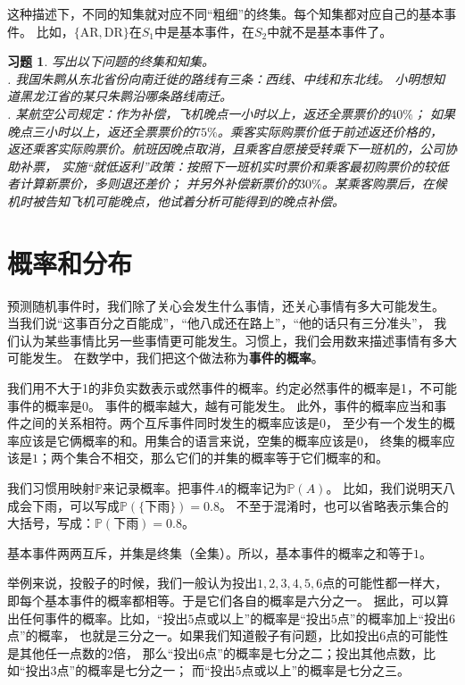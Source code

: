 \documentclass[12pt,UTF8]{ctexbook}
\newtheorem{xt}{习题}[section]
\begin{document}
这种描述下，不同的知集就对应不同“粗细”的终集。每个知集都对应自己的基本事件。
比如，$\{\mbox{AR}, \mbox{DR}\}$在$S_1$中是基本事件，在$S_2$中就不是基本事件了。

\begin{xt}
    写出以下问题的终集和知集。\\
    . 我国朱鹮从东北省份向南迁徙的路线有三条：西线、中线和东北线。
    小明想知道黑龙江省的某只朱鹮沿哪条路线南迁。\\
    . 某航空公司规定：作为补偿，飞机晚点一小时以上，返还全票票价的$40\%$；
    如果晚点三小时以上，返还全票票价的$75\%$。乘客实际购票价低于前述返还价格的，
    返还乘客实际购票价。航班因晚点取消，且乘客自愿接受转乘下一班机的，公司协助补票，
    实施“就低返利”政策：按照下一班机实时票价和乘客最初购票价的较低者计算新票价，多则退还差价；
    并另外补偿新票价的$30\%$。某乘客购票后，在候机时被告知飞机可能晚点，他试着分析可能得到的晚点补偿。
\end{xt}

\section{概率和分布}

预测随机事件时，我们除了关心会发生什么事情，还关心事情有多大可能发生。
当我们说“这事百分之百能成”，“他八成还在路上”，“他的话只有三分准头”，
我们认为某些事情比另一些事情更可能发生。习惯上，我们会用数来描述事情有多大可能发生。
在数学中，我们把这个做法称为\textbf{事件的概率}。

我们用不大于1的非负实数表示或然事件的概率。约定必然事件的概率是1，不可能事件的概率是0。
事件的概率越大，越有可能发生。
此外，事件的概率应当和事件之间的关系相符。两个互斥事件同时发生的概率应该是$0$，
至少有一个发生的概率应该是它俩概率的和。用集合的语言来说，空集的概率应该是$0$，
终集的概率应该是$1$；两个集合不相交，那么它们的并集的概率等于它们概率的和。

我们习惯用映射$\mathbb{P}$来记录概率。把事件$A$的概率记为$\mathbb{P}(A)$。
比如，我们说明天八成会下雨，可以写成$\mathbb{P}(\{\mbox{下雨}\}) = 0.8$。
不至于混淆时，也可以省略表示集合的大括号，写成：$\mathbb{P}(\mbox{下雨}) = 0.8$。

基本事件两两互斥，并集是终集（全集）。所以，基本事件的概率之和等于$1$。

举例来说，投骰子的时候，我们一般认为投出$1,2,3,4,5,6$点的可能性都一样大，
即每个基本事件的概率都相等。于是它们各自的概率是六分之一。
据此，可以算出任何事件的概率。比如，“投出$5$点或以上”的概率是“投出$5$点”的概率加上“投出$6$点”的概率，
也就是三分之一。如果我们知道骰子有问题，比如投出$6$点的可能性是其他任一点数的$2$倍，
那么“投出$6$点”的概率是七分之二；投出其他点数，比如“投出$3$点”的概率是七分之一；
而“投出$5$点或以上”的概率是七分之三。
\end{document}
